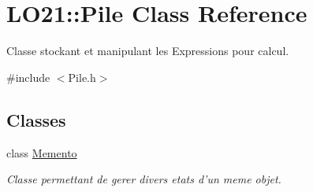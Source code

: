 \hypertarget{class_l_o21_1_1_pile}{\section{\-L\-O21\-:\-:\-Pile \-Class \-Reference}
\label{class_l_o21_1_1_pile}
}


\-Classe stockant et manipulant les \-Expressions pour calcul.  




{\ttfamily \#include $<$\-Pile.\-h$>$}

\subsection*{\-Classes}
\begin{DoxyCompactItemize}
\item 
class \hyperlink{class_l_o21_1_1_pile_1_1_memento}{\-Memento}
\begin{DoxyCompactList}\small\item\em \-Classe permettant de gerer divers etats d'un meme objet. \end{DoxyCompactList}\end{DoxyCompactItemize}
